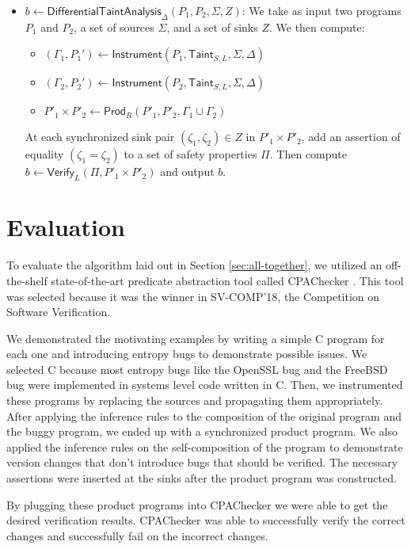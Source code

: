 \documentclass[letterpaper,twocolumn,10pt]{article}
\begin{document}
\begin{itemize}
    \item $b \gets \mathsf{DifferentialTaintAnalysis}_\Delta(P_1, P_2, \Sigma, Z)$: We take 
    as input two programs $P_1$ and $P_2$, a set of sources $\Sigma$, and a set of 
    sinks $Z$. We then compute:
    \begin{itemize}
        \item $(\Gamma_1, P_1') \gets \mathsf{Instrument}(P_1, \mathsf{Taint}_{S,L}, \Sigma, \Delta)$
        \item $(\Gamma_2, P_2') \gets \mathsf{Instrument}(P_2, \mathsf{Taint}_{S,L}, \Sigma, \Delta)$
        \item $P'_1 \times P'_2 \gets \mathsf{Prod}_R(P'_1, P'_2, \Gamma_1 \cup \Gamma_2)$
    \end{itemize}
    At each synchronized sink pair $(\zeta_1, \zeta_2) \in Z$ in $P'_1 \times P'_2$, add an assertion of equality 
    $(\zeta_1 = \zeta_2)$ to a set of safety properties $\Pi$. Then compute $b \gets \mathsf{Verify}_{L}(\Pi, P'_1 \times P'_2)$
    and output $b$.
\end{itemize}

\section{Evaluation}
\label{sec:eval}

To evaluate the algorithm laid out in Section \ref{sec:all-together}, we utilized an off-the-shelf state-of-the-art predicate abstraction tool called CPAChecker \cite{beyer2011cpachecker}. This tool was selected because it was the winner in SV-COMP'18, the Competition on Software Verification. 

We demonstrated the motivating examples by writing a simple C program for each one and introducing entropy bugs to demonstrate possible issues. We selected C because most entropy bugs like the OpenSSL bug and the FreeBSD bug were implemented in systems level code written in C. Then, we instrumented these programs by replacing the sources and propagating them appropriately. After applying the inference rules to the composition of the original program and the buggy program, we ended up with a synchronized product program. We also applied the inference rules on the self-composition of the program to demonstrate version changes that don't introduce bugs that should be verified. The necessary assertions were inserted at the sinks after the product program was constructed.

By plugging these product programs into CPAChecker we were able to get the desired verification results. CPAChecker was able to successfully verify the correct changes and successfully fail on the incorrect changes. 
\end{document}
